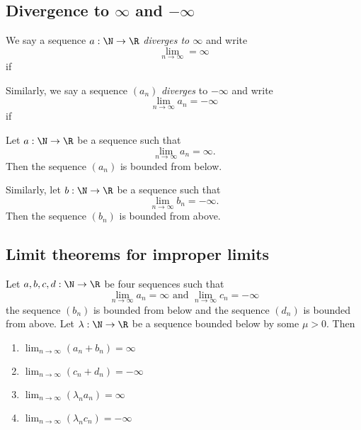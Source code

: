 \subsection{Divergence to \texorpdfstring{$\infty$}{infinity} and \texorpdfstring{$-\infty$}{minus infinity}}
\begin{definition}
    We say a sequence $a: \N \to \R$ \emph{diverges to $\infty$} and write 
    $$\lim_{n\to\infty} = \infty$$
    if
    \begin{myCenter}
    \end{myCenter}

    Similarly, we say a sequence $(a_n)$ \emph{diverges} to $-\infty$ and write
    $$\lim_{n\to\infty}a_n = -\infty$$
    if
    \begin{myCenter}
    \end{myCenter}
\end{definition}

\begin{proposition}
    Let $a: \N \to \R$ be a sequence such that 
    $$\lim_{n\to\infty}a_n = \infty.$$
    Then the sequence $(a_n)$ is bounded from below.

    Similarly, let $b: \N \to \R$ be a sequence such that 
    $$\lim_{n\to\infty}b_n = -\infty.$$
    Then the sequence $(b_n)$ is bounded from above.
\end{proposition}

\subsection{Limit theorems for improper limits}
\begin{theorem}
    Let $a,b,c,d: \N \to \R$ be four sequences such that
    $$\lim_{n\to\infty}a_n = \infty \text{ and } \lim_{n\to\infty}c_n = -\infty$$
    the sequence $(b_n)$ is bounded from below and the sequence $(d_n)$ is bounded from above. Let $\lambda: \N \to \R$ be a sequence bounded below by some $\mu > 0$. Then
    \begin{enumerate}[label=\roman*.]
        \item $\lim_{n\to\infty}(a_n + b_n) = \infty$
        \item $\lim_{n\to\infty}(c_n + d_n) = -\infty$
        \item $\lim_{n\to\infty}(\lambda_n a_n) = \infty$
        \item $\lim_{n\to\infty}(\lambda_n c_n) = -\infty$
    \end{enumerate}
\end{theorem}


